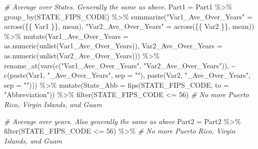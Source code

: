 \documentclass[
]{article}
\newenvironment{Shaded}{\begin{snugshade}}{\end{snugshade}}
\newcommand{\AttributeTok}[1]{\textcolor[rgb]{0.77,0.63,0.00}{#1}}
\newcommand{\CommentTok}[1]{\textcolor[rgb]{0.56,0.35,0.01}{\textit{#1}}}
\newcommand{\DecValTok}[1]{\textcolor[rgb]{0.00,0.00,0.81}{#1}}
\newcommand{\FunctionTok}[1]{\textcolor[rgb]{0.00,0.00,0.00}{#1}}
\newcommand{\NormalTok}[1]{#1}
\newcommand{\OtherTok}[1]{\textcolor[rgb]{0.56,0.35,0.01}{#1}}
\newcommand{\SpecialCharTok}[1]{\textcolor[rgb]{0.00,0.00,0.00}{#1}}
\newcommand{\StringTok}[1]{\textcolor[rgb]{0.31,0.60,0.02}{#1}}
\begin{document}
\begin{Shaded}
\begin{Highlighting}[]
    \CommentTok{\# Average over States. Generally the same as above.}
\NormalTok{    Part1 }\OtherTok{=}\NormalTok{ Part1 }\SpecialCharTok{\%\textgreater{}\%} \FunctionTok{group\_by}\NormalTok{(STATE\_FIPS\_CODE) }\SpecialCharTok{\%\textgreater{}\%}
      \FunctionTok{summarize}\NormalTok{(}\StringTok{"Var1\_Ave\_Over\_Years"} \OtherTok{=} \FunctionTok{across}\NormalTok{(\{\{ Var1 \}\}, mean), }
                \StringTok{"Var2\_Ave\_Over\_Years"} \OtherTok{=} \FunctionTok{across}\NormalTok{(\{\{ Var2 \}\}, mean)) }\SpecialCharTok{\%\textgreater{}\%}
      \FunctionTok{mutate}\NormalTok{(}\AttributeTok{Var1\_Ave\_Over\_Years =} \FunctionTok{as.numeric}\NormalTok{(}\FunctionTok{unlist}\NormalTok{(Var1\_Ave\_Over\_Years)), }
             \AttributeTok{Var2\_Ave\_Over\_Years =} \FunctionTok{as.numeric}\NormalTok{(}\FunctionTok{unlist}\NormalTok{(Var2\_Ave\_Over\_Years))) }\SpecialCharTok{\%\textgreater{}\%}
      \FunctionTok{rename\_at}\NormalTok{(}\FunctionTok{vars}\NormalTok{(}\FunctionTok{c}\NormalTok{(}\StringTok{"Var1\_Ave\_Over\_Years"}\NormalTok{, }\StringTok{"Var2\_Ave\_Over\_Years"}\NormalTok{)),}
                \SpecialCharTok{\textasciitilde{}} \FunctionTok{c}\NormalTok{(}\FunctionTok{paste}\NormalTok{(Var1, }\StringTok{"\_Ave\_Over\_Years"}\NormalTok{, }\AttributeTok{sep =} \StringTok{""}\NormalTok{),}
                    \FunctionTok{paste}\NormalTok{(Var2, }\StringTok{"\_Ave\_Over\_Years"}\NormalTok{, }\AttributeTok{sep =} \StringTok{""}\NormalTok{))) }\SpecialCharTok{\%\textgreater{}\%}
      \FunctionTok{mutate}\NormalTok{(}\AttributeTok{State\_Abb =} \FunctionTok{fips}\NormalTok{(STATE\_FIPS\_CODE, }\AttributeTok{to =}  \StringTok{"Abbreviation"}\NormalTok{)) }\SpecialCharTok{\%\textgreater{}\%}
      \FunctionTok{filter}\NormalTok{(STATE\_FIPS\_CODE }\SpecialCharTok{\textless{}=} \DecValTok{56}\NormalTok{) }\CommentTok{\# No more Puerto Rico, Virgin Islands, and Guam}
    
    \CommentTok{\# Average over years. Also generally the same as above}
\NormalTok{    Part2 }\OtherTok{=}\NormalTok{ Part2 }\SpecialCharTok{\%\textgreater{}\%} 
      \FunctionTok{filter}\NormalTok{(STATE\_FIPS\_CODE }\SpecialCharTok{\textless{}=} \DecValTok{56}\NormalTok{) }\SpecialCharTok{\%\textgreater{}\%} 
      \CommentTok{\# No more Puerto Rico, Virgin Islands, and Guam}
      

\end{Highlighting}
\end{Shaded}
\end{document}
